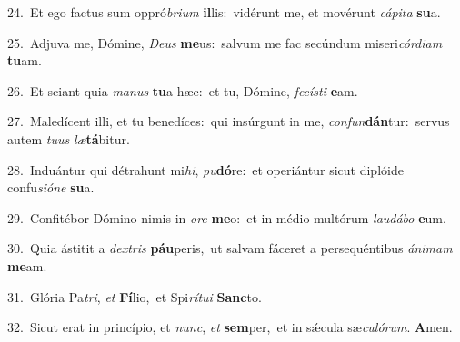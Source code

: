 {\numbfont\textcolor{\numbcolor}{24.}}~Et ego factus sum oppró\-\textit{bri}\-\textit{um} \textbf{il}\-lis:~\star vidérunt me, et movérunt \textit{cá}\-\textit{pi}\textit{ta} \textbf{su}\-a.\par
{\numbfont\textcolor{\numbcolor}{25.}}~Adjuva me, Dómine, \textit{De}\-\textit{us} \textbf{me}\-us:~\star salvum me fac secúndum miseri\-\textit{cór}\-\textit{di}\textit{am} \textbf{tu}\-am.\par
{\numbfont\textcolor{\numbcolor}{26.}}~Et sciant quia \textit{ma}\-\textit{nus} \textbf{tu}\-a hæc:~\star et tu, Dómine, \textit{fe}\-\textit{cís}\textit{ti} \textbf{e}\-am.\par
{\numbfont\textcolor{\numbcolor}{27.}}~Maledícent illi, et tu benedíces:~\dagger qui insúrgunt in me, \textit{con}\-\textit{fun}\textbf{dán}tur:~\star servus autem \textit{tu}\-\textit{us} \textit{læ}\-\textbf{tá}bitur.\par
{\numbfont\textcolor{\numbcolor}{28.}}~Induántur qui détrahunt mi\-\textit{hi}\-, \textit{pu}\-\textbf{dó}re:~\star et operiántur sicut diplóide confu\-\textit{si}\-\textit{ó}\textit{ne} \textbf{su}\-a.\par
{\numbfont\textcolor{\numbcolor}{29.}}~Confitébor Dómino nimis in \textit{o}\-\textit{re} \textbf{me}\-o:~\star et in médio multórum \textit{lau}\-\textit{dá}\textit{bo} \textbf{e}\-um.\par
{\numbfont\textcolor{\numbcolor}{30.}}~Quia ástitit a \textit{dex}\-\textit{tris} \textbf{páu}\-peris,~\star ut salvam fáceret a persequéntibus \textit{á}\-\textit{ni}\textit{mam} \textbf{me}\-am.\par
{\numbfont\textcolor{\numbcolor}{31.}}~Glória Pa\-\textit{tri}\-, \textit{et} \textbf{Fí}\-lio,~\star et Spi\-\textit{rí}\-\textit{tu}\textit{i} \textbf{Sanc}\-to.\par
{\numbfont\textcolor{\numbcolor}{32.}}~Sicut erat in princípio, et \textit{nunc}\-, \textit{et} \textbf{sem}\-per,~\star et in sǽcula sæ\-\textit{cu}\-\textit{ló}\textit{rum}. \textbf{A}\-men.\par
